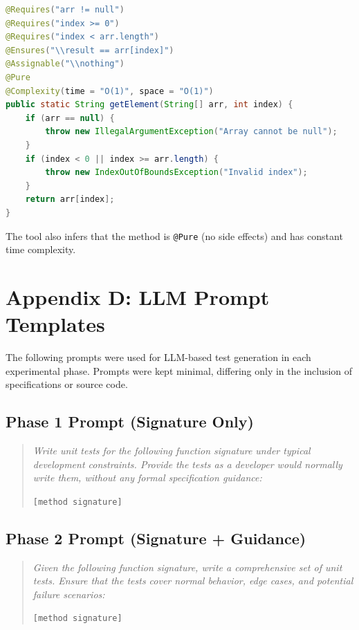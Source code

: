 \documentclass[11pt]{article}
\begin{document}
\begin{lstlisting}[language=Java, caption={Output method with inferred JML specifications}, label={lst:after-supp}]
@Requires("arr != null")
@Requires("index >= 0")
@Requires("index < arr.length")
@Ensures("\\result == arr[index]")
@Assignable("\\nothing")
@Pure
@Complexity(time = "O(1)", space = "O(1)")
public static String getElement(String[] arr, int index) {
    if (arr == null) {
        throw new IllegalArgumentException("Array cannot be null");
    }
    if (index < 0 || index >= arr.length) {
        throw new IndexOutOfBoundsException("Invalid index");
    }
    return arr[index];
}
\end{lstlisting}

The tool also infers that the method is \texttt{@Pure} (no side effects) and has constant time complexity.

\section{Appendix D: LLM Prompt Templates}
\label{app:prompts}

The following prompts were used for LLM-based test generation in each experimental phase. Prompts were kept minimal, differing only in the inclusion of specifications or source code.

\subsection{Phase 1 Prompt (Signature Only)}
\begin{quote}
\textit{Write unit tests for the following function signature under typical development constraints. Provide the tests as a developer would normally write them, without any formal specification guidance:}

\texttt{[method signature]}
\end{quote}

\subsection{Phase 2 Prompt (Signature + Guidance)}
\begin{quote}
\textit{Given the following function signature, write a comprehensive set of unit tests. Ensure that the tests cover normal behavior, edge cases, and potential failure scenarios:}

\texttt{[method signature]}
\end{quote}
\end{document}
